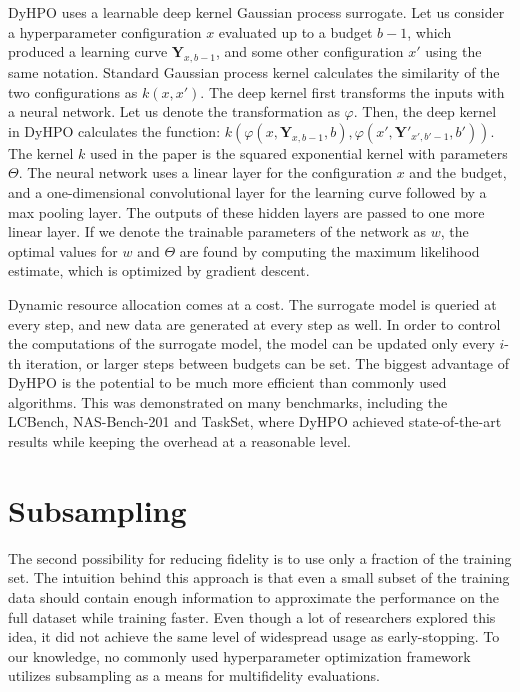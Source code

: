 DyHPO uses a learnable deep kernel Gaussian process surrogate. Let us consider a hyperparameter configuration $x$ evaluated up to a budget $b-1$, which produced a learning curve $\mathbf{Y}_{x,b-1}$, and some other configuration $x'$ using the same notation. Standard Gaussian process kernel calculates the similarity of the two configurations as $k(x,x')$. The deep kernel first transforms the inputs with a neural network. Let us denote the transformation as $\varphi$. Then, the deep kernel in DyHPO calculates the function: $k(\varphi(x,\mathbf{Y}_{x,b-1}, b), \varphi(x',\mathbf{Y}'_{x',b'-1}, b'))$. The kernel $k$ used in the paper is the squared exponential kernel with parameters $\Theta$. The neural network uses a linear layer for the configuration $x$ and the budget, and a one-dimensional convolutional layer for the learning curve followed by a max pooling layer. The outputs of these hidden layers are passed to one more linear layer. If we denote the trainable parameters of the network as $w$, the optimal values for $w$ and $\Theta$ are found by computing the maximum likelihood estimate, which is optimized by gradient descent.

Dynamic resource allocation comes at a cost. The surrogate model is queried at every step, and new data are generated at every step as well. In order to control the computations of the surrogate model, the model can be updated only every $i$-th iteration, or larger steps between budgets can be set. The biggest advantage of DyHPO is the potential to be much more efficient than commonly used algorithms. This was demonstrated on many benchmarks, including the LCBench, NAS-Bench-201 and TaskSet, where DyHPO achieved state-of-the-art results while keeping the overhead at a reasonable level.



\section{Subsampling}
The second possibility for reducing fidelity is to use only a fraction of the training set. The intuition behind this approach is that even a small subset of the training data should contain enough information to approximate the performance on the full dataset while training faster. Even though a lot of researchers explored this idea, it did not achieve the same level of widespread usage as early-stopping. To our knowledge, no commonly used hyperparameter optimization framework utilizes subsampling as a means for multifidelity evaluations.

